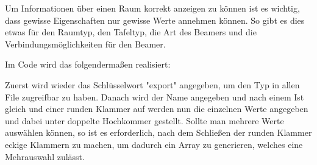 
Um Informationen über einen Raum korrekt anzeigen zu können ist es wichtig, dass gewisse Eigenschaften nur gewisse Werte annehmen können. So gibt es dies etwas für den Raumtyp, den Tafeltyp, die Art des Beamers und die Verbindungsmöglichkeiten für den Beamer.

Im Code wird das folgendermaßen realisiert:

Zuerst wird wieder das Schlüsselwort "export" angegeben, um den Typ in allen File zugreifbar zu haben. Danach wird der Name angegeben und nach einem Ist gleich und einer runden Klammer auf werden nun die einzelnen Werte angegeben und dabei unter doppelte Hochkommer gestellt. Sollte man mehrere Werte auswählen können, so ist es erforderlich, nach dem Schließen der runden Klammer eckige Klammern zu machen, um dadurch ein Array zu generieren, welches eine Mehrauswahl zulässt.



